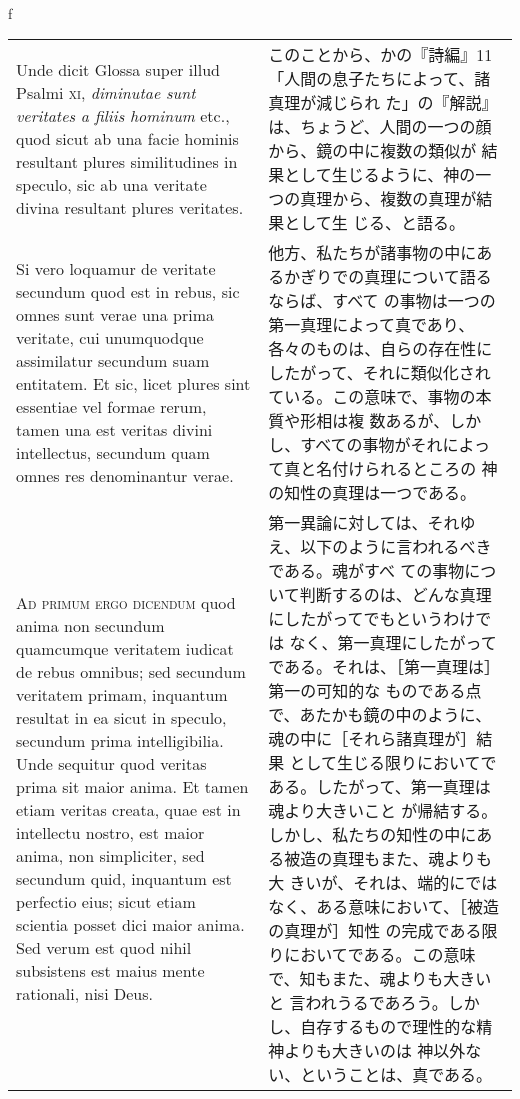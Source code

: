 \\f\documentclass[10pt]{jsarticle} %
\begin{document}
\begin{longtable}{p{21em}p{21em}}
\\

Unde dicit Glossa super illud Psalmi {\scshape xi}, {\itshape
diminutae sunt veritates a filiis hominum} etc., quod sicut ab una
facie hominis resultant plures similitudines in speculo, sic ab una
veritate divina resultant plures veritates.

&

このことから、かの『詩編』11「人間の息子たちによって、諸真理が減じられ
 た」の『解説』は、ちょうど、人間の一つの顔から、鏡の中に複数の類似が
 結果として生じるように、神の一つの真理から、複数の真理が結果として生
 じる、と語る。

\\

Si vero loquamur de veritate secundum quod est in rebus, sic omnes
sunt verae una prima veritate, cui unumquodque assimilatur secundum
suam entitatem. Et sic, licet plures sint essentiae vel formae rerum,
tamen una est veritas divini intellectus, secundum quam omnes res
denominantur verae.

&

他方、私たちが諸事物の中にあるかぎりでの真理について語るならば、すべて
 の事物は一つの第一真理によって真であり、各々のものは、自らの存在性に
 したがって、それに類似化されている。この意味で、事物の本質や形相は複
 数あるが、しかし、すべての事物がそれによって真と名付けられるところの
 神の知性の真理は一つである。

\\

{\scshape Ad primum ergo dicendum} quod anima non secundum quamcumque
veritatem iudicat de rebus omnibus; sed secundum veritatem primam,
inquantum resultat in ea sicut in speculo, secundum prima
intelligibilia. Unde sequitur quod veritas prima sit maior anima. Et
tamen etiam veritas creata, quae est in intellectu nostro, est maior
anima, non simpliciter, sed secundum quid, inquantum est perfectio
eius; sicut etiam scientia posset dici maior anima. Sed verum est quod
nihil subsistens est maius mente rationali, nisi Deus.

&

第一異論に対しては、それゆえ、以下のように言われるべきである。魂がすべ
ての事物について判断するのは、どんな真理にしたがってでもというわけでは
なく、第一真理にしたがってである。それは、［第一真理は］第一の可知的な
ものである点で、あたかも鏡の中のように、魂の中に［それら諸真理が］結果
として生じる限りにおいてである。したがって、第一真理は魂より大きいこと
が帰結する。しかし、私たちの知性の中にある被造の真理もまた、魂よりも大
きいが、それは、端的にではなく、ある意味において、［被造の真理が］知性
の完成である限りにおいてである。この意味で、知もまた、魂よりも大きいと
言われうるであろう。しかし、自存するもので理性的な精神よりも大きいのは
神以外ない、ということは、真である。


\end{longtable}
\end{document}
